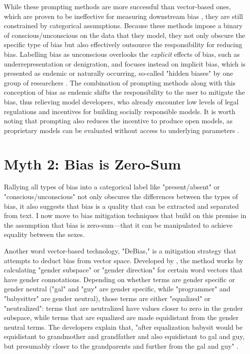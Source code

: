 \documentclass[11pt]{article}
\begin{document}
While these prompting methods are more successful than vector-based
ones, which are proven to be ineffective for measuring downstream
bias \citep{gonen:2019}, they are still constrained by categorical assumptions. 
Because these methods impose a binary of
conscious/unconscious on the data that they model, they not only obscure the specific 
type of bias but also effectively outsource the
responsibility for reducing bias. Labelling bias as unconscious
overlooks the \emph{explicit} effects of bias, such as
underrepresentation or denigration, and focuses instead on implicit
bias, which is presented as endemic or naturally occurring, so-called "hidden biases" by one group of researchers \citep{kaneko:2024}. The combination of prompting
methods along with this conception of bias as endemic shifts the responsibility to the user to mitigate the bias, thus relieving
model developers, who already encounter low levels of legal regulations and incentives for building socially responsible models. It is worth noting that
prompting also reduces the incentive to produce open models, as
proprietary models can be evaluated without access to underlying
parameters \citep{thakur:2023,furniturewala:2024}.

\section{Myth 2: Bias is Zero-Sum}

Rallying all types of bias into a categorical label like "present/absent" or
"conscious/unconscious" not only obscures the differences between the
types of bias, it also suggests that bias is a quality that can be
extracted and separated from text. I now move to bias mitigation
techniques that build on this premise in the assumption that bias is
zero-sum---that it can be manipulated to achieve equality between the
sexes.

Another word vector-based technology, "DeBias," is a mitigation
strategy that attempts to deduct bias from vector space. Developed
by \citet{bolukbasi:2016}, the method works by calculating "gender
subspace" or "gender direction" for certain word vectors that have
gender connotations. Depending on whether terms are gender specific or
gender neutral ("gal" and "guy" are gender specific, while
"programmer" and "babysitter" are gender neutral), those terms are
either "equalized" or "neutralized": terms that are neutralized have
values closer to zero in the gender subspace, while terms that are
equalized are made equidistant from the gender neutral terms. The
developers explain that, "after equalization babysit would be
equidistant to grandmother and grandfather and also equidistant to
gal and guy, but presumably closer to the grandparents and further
from the gal and guy" \citep{bolukbasi:2016}.
\end{document}

